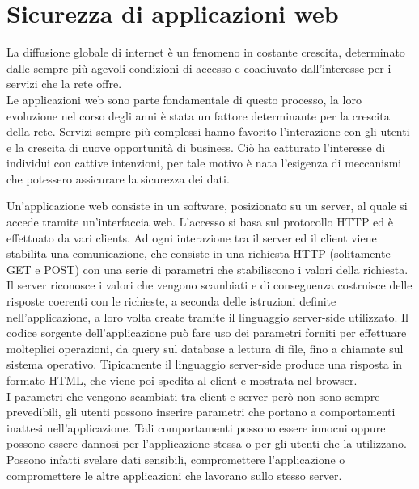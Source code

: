
\chapter{Sicurezza di applicazioni web}

\begin{epigraphs}
\end{epigraphs}

La diffusione globale di internet è un fenomeno in costante crescita, determinato dalle sempre più agevoli condizioni di accesso e coadiuvato dall'interesse per i servizi che la rete offre. \\
Le applicazioni web sono parte fondamentale di questo processo, la loro evoluzione nel corso degli anni è stata un fattore determinante per la crescita della rete. Servizi sempre più complessi hanno favorito l'interazione con gli utenti e la crescita di nuove opportunità di business. Ciò ha catturato l'interesse di individui con cattive intenzioni, per tale motivo è nata l'esigenza di meccanismi che potessero assicurare la sicurezza dei dati.

Un'applicazione web consiste in un software, posizionato su un server, al quale si accede tramite un'interfaccia web. L'accesso si basa sul protocollo HTTP ed è effettuato da vari clients. Ad ogni interazione tra il server ed il client viene stabilita una comunicazione, che consiste in una richiesta HTTP (solitamente GET e POST) con una serie di parametri che stabiliscono i valori della richiesta.\\
Il server riconosce i valori che vengono scambiati e di conseguenza costruisce delle risposte coerenti con le richieste, a seconda delle istruzioni definite nell'applicazione, a loro volta create tramite il linguaggio server-side utilizzato. Il codice sorgente dell'applicazione può fare uso dei parametri forniti per effettuare molteplici operazioni, da query sul database a lettura di file, fino a chiamate sul sistema operativo. Tipicamente il linguaggio server-side produce una risposta in formato HTML, che viene poi spedita al client e mostrata nel browser.\\
I parametri che vengono scambiati tra client e server però non sono sempre prevedibili, gli utenti possono inserire parametri che portano a comportamenti inattesi nell'applicazione. Tali comportamenti possono essere innocui oppure possono essere dannosi per l'applicazione stessa o per gli utenti che la utilizzano. Possono infatti svelare dati sensibili, compromettere l'applicazione o compromettere le altre applicazioni che lavorano sullo stesso server. 

